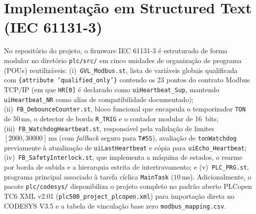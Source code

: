 \begin{figure}[htb]
{%
  }
\end{figure}

\section{Implementação em Structured Text (IEC 61131-3)}
\label{sec:clp_codigo}

No repositório do projeto, o firmware IEC 61131-3 é estruturado de forma modular no diretório \texttt{plc/src/} em cinco unidades de organização de programa (POUs) reutilizáveis: (i)~\texttt{GVL\_Modbus.st}, lista de variáveis globais qualificada com \texttt{\{attribute 'qualified\_only'\}} contendo os 23 pontos do contrato Modbus TCP/IP (em que \texttt{HR[0]} é declarado como \texttt{uiHeartbeat\_Sup}, mantendo \texttt{uiHeartbeat\_NR} como alias de compatibilidade documentado); (ii)~\texttt{FB\_DebounceCounter.st}, bloco funcional que encapsula o temporizador \texttt{TON} de $50\,\text{ms}$, o detector de borda \texttt{R\_TRIG} e o contador modular de 16~bits; (iii)~\texttt{FB\_WatchdogHeartbeat.st}, responsável pela validação de limites $[2000, 30000]\,\text{ms}$ (com \textit{fallback} seguro para \texttt{T\#5S}), avaliação de \texttt{tonWatchdog} previamente à atualização de \texttt{uiLastHeartbeat} e cópia para \texttt{uiEcho\_Heartbeat}; (iv)~\texttt{FB\_SafetyInterlock.st}, que implementa a máquina de estados, o rearme por borda de subida e a hierarquia estrita de intertravamento; e (v)~\texttt{PLC\_PRG.st}, programa principal associado à tarefa cíclica \texttt{MainTask} ($10\,\text{ms}$). Adicionalmente, o pacote \texttt{plc/codesys/} disponibiliza o projeto completo no padrão aberto PLCopen TC6 XML v2.01 (\texttt{plc500\_project\_plcopen.xml}) para importação direta no CODESYS V3.5 e a tabela de vinculação base zero \texttt{modbus\_mapping.csv}.

